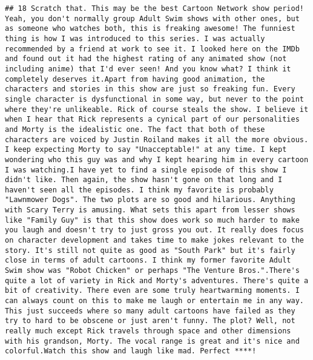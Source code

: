 \documentclass[
]{article}
\begin{document}
\begin{verbatim}
## 18 Scratch that. This may be the best Cartoon Network show period! Yeah, you don't normally group Adult Swim shows with other ones, but as someone who watches both, this is freaking awesome! The funniest thing is how I was introduced to this series. I was actually recommended by a friend at work to see it. I looked here on the IMDb and found out it had the highest rating of any animated show (not including anime) that I'd ever seen! And you know what? I think it completely deserves it.Apart from having good animation, the characters and stories in this show are just so freaking fun. Every single character is dysfunctional in some way, but never to the point where they're unlikeable. Rick of course steals the show. I believe it when I hear that Rick represents a cynical part of our personalities and Morty is the idealistic one. The fact that both of these characters are voiced by Justin Roiland makes it all the more obvious. I keep expecting Morty to say "Unacceptable!" at any time. I kept wondering who this guy was and why I kept hearing him in every cartoon I was watching.I have yet to find a single episode of this show I didn't like. Then again, the show hasn't gone on that long and I haven't seen all the episodes. I think my favorite is probably "Lawnmower Dogs". The two plots are so good and hilarious. Anything with Scary Terry is amusing. What sets this apart from lesser shows like "Family Guy" is that this show does work so much harder to make you laugh and doesn't try to just gross you out. It really does focus on character development and takes time to make jokes relevant to the story. It's still not quite as good as "South Park" but it's fairly close in terms of adult cartoons. I think my former favorite Adult Swim show was "Robot Chicken" or perhaps "The Venture Bros.".There's quite a lot of variety in Rick and Morty's adventures. There's quite a bit of creativity. There even are some truly heartwarming moments. I can always count on this to make me laugh or entertain me in any way. This just succeeds where so many adult cartoons have failed as they try to hard to be obscene or just aren't funny. The plot? Well, not really much except Rick travels through space and other dimensions with his grandson, Morty. The vocal range is great and it's nice and colorful.Watch this show and laugh like mad. Perfect ****!

\end{verbatim}
\end{document}
